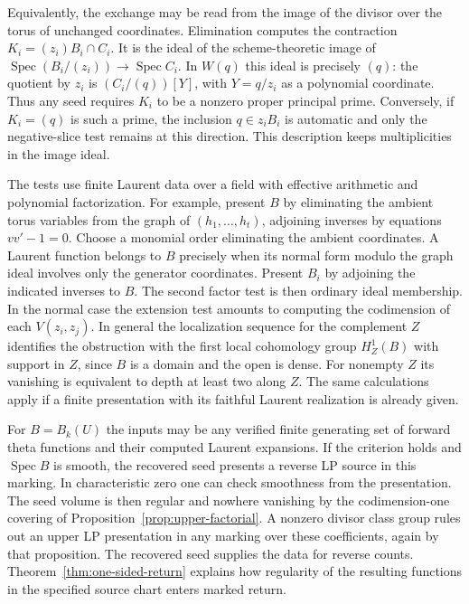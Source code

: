 \documentclass[11pt,reqno]{amsart}
\numberwithin{equation}{section}
\theoremstyle{definition}
\theoremstyle{remark}
\DeclareMathOperator{\Spec}{Spec}
\begin{document}
Equivalently, the exchange may be read from the image of the divisor
over the torus of unchanged coordinates. Elimination computes the
contraction \(K_i=(z_i)B_i\cap C_i\). It is the ideal of the scheme-theoretic image of
\(\Spec(B_i/(z_i))\to\Spec C_i\). In \(W(q)\) this ideal is
precisely \((q)\): the quotient by \(z_i\) is
\((C_i/(q))[Y]\), with \(Y=q/z_i\) as a polynomial coordinate.
Thus any seed requires \(K_i\) to be a nonzero proper principal
prime. Conversely, if \(K_i=(q)\) is such a prime, the inclusion
\(q\in z_iB_i\) is automatic and only the negative-slice test
remains at this direction. This description keeps multiplicities in
the image ideal.

The tests use finite Laurent data over a field with effective
arithmetic and polynomial factorization. For example, present \(B\)
by eliminating the ambient torus variables from the graph of
\((h_1,\ldots,h_t)\), adjoining inverses by equations \(vv'-1=0\).
Choose a monomial order eliminating the ambient coordinates. A Laurent
function belongs to \(B\) precisely when its normal form modulo the
graph ideal involves only the generator coordinates. Present \(B_i\) by adjoining the indicated
inverses to \(B\). The second factor test is then ordinary ideal
membership. In the normal case the extension test amounts to computing
the codimension of each \(V(z_i,z_j)\). In general the localization
sequence for the complement \(Z\) identifies the obstruction with
the first local cohomology group \(H^1_Z(B)\) with support in \(Z\),
since \(B\) is a domain and the open is dense.
For nonempty \(Z\) its vanishing is equivalent to depth at least two
along \(Z\). The same calculations apply if
a finite presentation with its faithful Laurent realization is
already given.

For \(B=B_k(U)\) the inputs may be any verified finite generating
set of forward theta functions and their computed Laurent expansions.
If the criterion holds and \(\Spec B\) is smooth, the recovered seed
presents a reverse LP source in this marking. In characteristic zero
one can check smoothness from the presentation. The seed volume
is then regular and nowhere vanishing by the codimension-one covering
of Proposition~\ref{prop:upper-factorial}. A nonzero divisor class
group rules out an upper LP presentation in any marking over these
coefficients, again by that proposition. The recovered seed supplies the data for reverse counts.
Theorem~\ref{thm:one-sided-return} explains how regularity of the
resulting functions in the specified source chart enters marked return.
\end{document}
